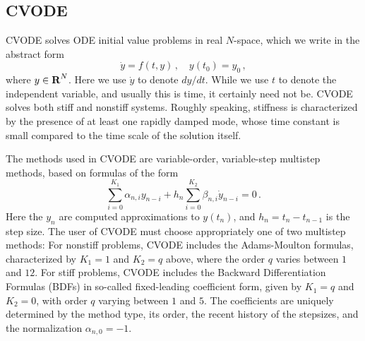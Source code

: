 \subsection{CVODE}\label{ss:cvode}

CVODE solves ODE initial value problems in real $N$-space, which we
write in the abstract form
\begin{equation}\label{ODE} 
  \dot{y} = f(t,y) \, ,\quad y(t_0) = y_0 \, ,
\end{equation}
where $y \in \mbox{\bf R}^N$.
Here we use $\dot{y}$ to denote $dy/dt$.  While we use $t$ to denote
the independent variable, and usually this is time, it certainly need
not be.  CVODE solves both stiff and nonstiff systems.  Roughly
speaking, stiffness is characterized by the presence of at least one
rapidly damped mode, whose time constant is small compared to the time
scale of the solution itself.

The methods used in CVODE are variable-order, variable-step multistep
methods, based on formulas of the form
\begin{equation}\label{LMM} 
 \sum_{i = 0}^{K_1} \alpha_{n,i} y_{n-i} + 
     h_n \sum_{i = 0}^{K_2} \beta_{n,i} \dot{y}_{n-i} = 0 \, .
\end{equation}
Here the $y_n$ are computed approximations to $y(t_n)$, and
$h_n = t_n - t_{n-1}$ is the step size.  The user of CVODE must choose
appropriately one of two multistep methods: For nonstiff problems,
CVODE includes the Adams-Moulton formulas, characterized by $K_1 = 1$
and $K_2 = q$ above, where the order $q$ varies between $1$ and $12$.
For stiff problems, CVODE includes the Backward Differentiation
Formulas (BDFs) in so-called fixed-leading coefficient form, given by
$K_1 = q$ and $K_2 = 0$, with order $q$ varying between $1$ and $5$.
The coefficients are uniquely determined by the method type, its
order, the recent history of the stepsizes, and the normalization
$\alpha_{n,0} = -1$.

